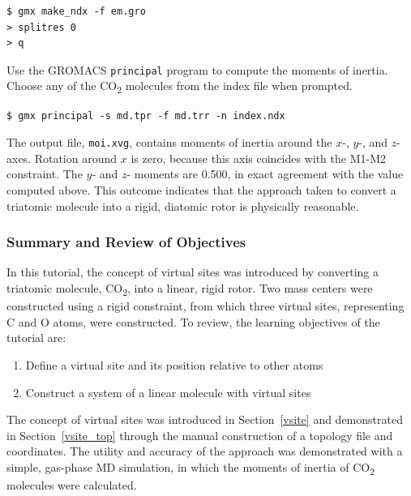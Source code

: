 \documentclass[9pt,tutorial]{livecoms}
\begin{document}
\begin{verbatim}
$ gmx make_ndx -f em.gro
> splitres 0
> q
\end{verbatim}

Use the GROMACS \texttt{principal} program to compute the moments of inertia. Choose any of the CO\textsubscript{2} molecules from the index file when prompted.

\begin{verbatim}
$ gmx principal -s md.tpr -f md.trr -n index.ndx
\end{verbatim}

The output file, \texttt{moi.xvg}, contains moments of inertia around the $x$-, $y$-, and $z$-axes. Rotation around $x$ is zero, because this axis coincides with the M1-M2 constraint. The $y$- and $z$- moments are 0.500, in exact agreement with the value computed above. This outcome indicates that the approach taken to convert a triatomic molecule into a rigid, diatomic rotor is physically reasonable.

\subsubsection{Summary and Review of Objectives} \label{vsite_summary}

In this tutorial, the concept of virtual sites was introduced by converting a triatomic molecule, CO\textsubscript{2}, into a linear, rigid rotor. Two mass centers were constructed using a rigid constraint, from which three virtual sites, representing C and O atoms, were constructed. To review, the learning objectives of the tutorial are:

\begin{enumerate}
	\item Define a virtual site and its position relative to other atoms
	\item Construct a system of a linear molecule with virtual sites
\end{enumerate}

The concept of virtual sites was introduced in Section~\ref{vsite} and demonstrated in Section~\ref{vsite_top} through the manual construction of a topology file and coordinates. The utility and accuracy of the approach was demonstrated with a simple, gas-phase MD simulation, in which the moments of inertia of CO\textsubscript{2} molecules were calculated.

\end{document}
